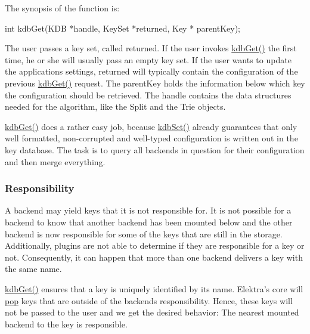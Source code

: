 The synopsis of the function is\+: \begin{DoxyVerb}    int kdbGet(KDB *handle, KeySet *returned, Key * parentKey);
\end{DoxyVerb}


The user passes a key set, called {\ttfamily returned}. If the user invokes {\ttfamily \hyperlink{group__kdb_ga28e385fd9cb7ccfe0b2f1ed2f62453a1}{kdb\+Get()}} the first time, he or she will usually pass an empty key set. If the user wants to update the application\textquotesingle{}s settings, {\ttfamily returned} will typically contain the configuration of the previous {\ttfamily \hyperlink{group__kdb_ga28e385fd9cb7ccfe0b2f1ed2f62453a1}{kdb\+Get()}} request. The {\ttfamily parent\+Key} holds the information below which key the configuration should be retrieved. The {\ttfamily handle} contains the data structures needed for the algorithm, like the {\ttfamily Split} and the {\ttfamily Trie} objects.

{\ttfamily \hyperlink{group__kdb_ga28e385fd9cb7ccfe0b2f1ed2f62453a1}{kdb\+Get()}} does a rather easy job, because {\ttfamily \hyperlink{group__kdb_ga11436b058408f83d303ca5e996832bcf}{kdb\+Set()}} already guarantees that only well formatted, non-\/corrupted and well-\/typed configuration is written out in the key database. The task is to query all backends in question for their configuration and then merge everything.

\subsubsection*{Responsibility}

A backend may yield keys that it is not responsible for. It is not possible for a backend to know that another backend has been mounted below and the other backend is now responsible for some of the keys that are still in the storage. Additionally, plugins are not able to determine if they are responsible for a key or not. Consequently, it can happen that more than one backend delivers a key with the same name.

{\ttfamily \hyperlink{group__kdb_ga28e385fd9cb7ccfe0b2f1ed2f62453a1}{kdb\+Get()}} ensures that a key is uniquely identified by its name. Elektra’s core will \hyperlink{md_doc_help_elektra-glossary_doc_help_elektra-glossary_md}{pop} keys that are outside of the backend\textquotesingle{}s responsibility. Hence, these keys will not be passed to the user and we get the desired behavior\+: The nearest mounted backend to the key is responsible.


